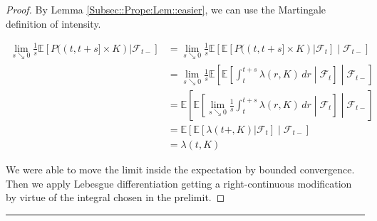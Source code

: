 \documentclass[12pt]{article}
\newcommand{\mb}{\mathbb}
\newcommand{\mc}{\mathcal}
\newcommand{\lin}{\rule{\linewidth}{0.4 pt}}
\newcommand{\ex}[1]{\mb{E}\left[#1\right]}			%
\renewcommand{\t}{t}							%
\renewcommand{\tt}{s}							%
\newcommand{\F}{\mc{F}}							%
\newcommand{\ts}[1]{_{#1}}						%
\newcommand{\rate}{\lambda}						%
\newcommand{\rp}{P}								%
\begin{document}
\begin{proof}
By Lemma \ref{Subsec::Prope:Lem::easier}, we can use the Martingale definition of intensity.

\begin{align*}
\lim_{\tt\searrow 0}\frac{1}{\tt}\ex{\rp((\t,\t+\tt]\times K)|\F\ts{\t-}}& = \lim_{\tt\searrow 0}\frac{1}{\tt}\ex{\ex{\rp((\t,\t+\tt]\times K)|\F\ts{\t}}\middle|\F\ts{\t-}}\\
&= \lim_{\tt\searrow 0}\frac{1}{\tt}\ex{\ex{\int_\t^{\t+\tt} \rate(r,K)\,dr\middle|\F\ts{\t}}\middle|\F\ts{\t-}}\\
&= \ex{\ex{\lim_{\tt \searrow 0} \frac{1}{\tt}\int_\t^{\t+\tt} \rate(r,K)\,dr\middle|\F\ts{\t}}\middle|\F\ts{\t-}}\\
&=\ex{\ex{\rate(\t+,K)|\F\ts{\t}}\middle|\F\ts{\t-}}\\
&=\rate(\t,K)
\end{align*}

We were able to move the limit inside the expectation by bounded convergence. Then we apply Lebesgue differentiation getting a right-continuous modification by virtue of the integral chosen in the prelimit.
\end{proof}

\lin
\end{document}

